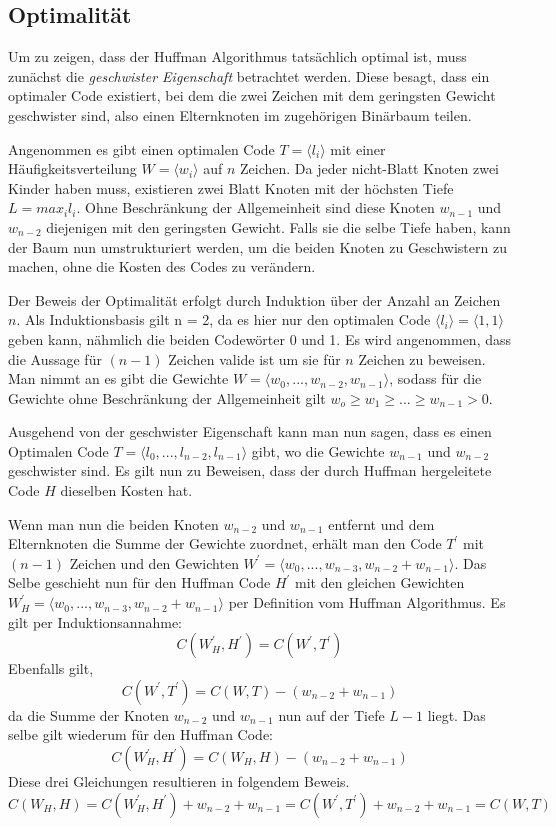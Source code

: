 \documentclass[course=erap]{aspdoc}
\begin{document}
\subsection{Optimalität}

Um zu zeigen, dass der Huffman Algorithmus tatsächlich optimal ist, muss zunächst die \textit{geschwister Eigenschaft} betrachtet werden.
Diese besagt, dass ein optimaler Code existiert, bei dem die zwei Zeichen mit dem geringsten Gewicht geschwister sind, also einen Elternknoten im zugehörigen Binärbaum teilen.

Angenommen es gibt einen optimalen Code $T = \langle l_i \rangle $ mit einer Häufigkeitsverteilung $W = \langle w_i \rangle $ auf $n$ Zeichen.
Da jeder nicht-Blatt Knoten zwei Kinder haben muss, existieren zwei Blatt Knoten mit der höchsten Tiefe $ L = max_i l_i$. Ohne Beschränkung der Allgemeinheit sind diese Knoten $w_{n-1}$ und $w_{n-2}$ diejenigen mit den geringsten Gewicht. Falls sie die selbe Tiefe haben, kann der Baum nun umstrukturiert werden, um die beiden Knoten zu Geschwistern zu machen, ohne die Kosten des Codes zu verändern.

Der Beweis der Optimalität erfolgt durch Induktion über der Anzahl an Zeichen $n$. \cite{HufProof}
Als Induktionsbasis gilt n = 2, da es hier nur den optimalen Code $ \langle l_i \rangle = \langle 1, 1 \rangle $ geben kann, nähmlich die beiden Codewörter 0 und 1.
Es wird angenommen, dass die Aussage für $(n-1)$ Zeichen valide ist um sie für $n$ Zeichen zu beweisen.
Man nimmt an es gibt die Gewichte $W = \langle w_0,..., w_{n-2}, w_{n-1} \rangle $, sodass für die Gewichte ohne Beschränkung der Allgemeinheit gilt $w_o \ge w_1 \ge ... \ge w_{n-1} > 0$.

Ausgehend von der geschwister Eigenschaft kann man nun sagen, dass es einen Optimalen Code $T = \langle l_0,..., l_{n-2}, l_{n-1} \rangle$ gibt, wo die Gewichte $w_{n-1}$ und $w_{n-2}$ geschwister sind. Es gilt nun zu Beweisen, dass der durch Huffman hergeleitete Code $H$ dieselben Kosten hat.

Wenn man nun die beiden Knoten $w_{n-2}$ und $w_{n-1}$ entfernt und dem Elternknoten die Summe der Gewichte zuordnet, erhält man den Code $T^{\prime}$ mit $(n-1)$ Zeichen und den Gewichten $W^{\prime} = \langle w_0,..., w_{n-3}, w_{n-2} + w_{n-1} \rangle$.
Das Selbe geschieht nun für den Huffman Code $H^{\prime}$ mit den gleichen Gewichten $W_H^{\prime} = \langle w_0,..., w_{n-3}, w_{n-2} + w_{n-1} \rangle $ per Definition vom Huffman Algorithmus.
Es gilt per Induktionsannahme: 
$$C(W_H^{\prime}, H^{\prime}) = C(W^\prime, T^{\prime})$$
Ebenfalls gilt,
$$ C(W^\prime, T^{\prime}) = C(W, T) - (w_{n-2} + w_{n-1})$$
da die Summe der Knoten $w_{n-2}$ und $w_{n-1}$ nun auf der Tiefe $L-1$ liegt.
Das selbe gilt wiederum für den Huffman Code:
$$ C(W_H^\prime, H^{\prime}) = C(W_H, H) - (w_{n-2} + w_{n-1})$$
Diese drei Gleichungen resultieren in folgendem Beweis.
$$ C(W_H, H) = C(W_H^\prime, H^{\prime}) + w_{n-2} + w_{n-1} = C(W^\prime, T^{\prime}) + w_{n-2} + w_{n-1} = C(W, T) $$
\end{document}
